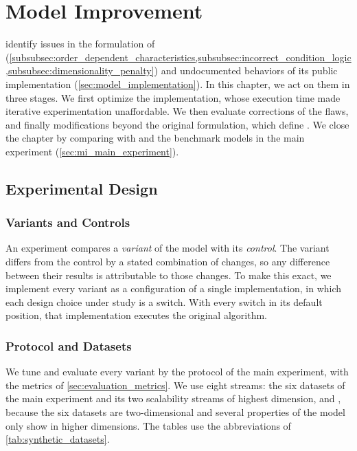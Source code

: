 \chapter{Model Improvement}
\label{chap:ModelImprovement}

 identify issues in the formulation of \MicroTEDAClus (\cref{subsubsec:order_dependent_characteristics,subsubsec:incorrect_condition_logic,subsubsec:dimensionality_penalty}) and undocumented behaviors of its public implementation (\cref{sec:model_implementation}). In this chapter, we act on them in three stages. We first optimize the implementation, whose execution time made iterative experimentation unaffordable. We then evaluate corrections of the flaws, and finally modifications beyond the original formulation, which define \MicroTEDAClusPlus. We close the chapter by comparing \MicroTEDAClusPlus with \MicroTEDAClus and the benchmark models in the main experiment (\cref{sec:mi_main_experiment}).

\section{Experimental Design}
\label{sec:mi_design}

\subsection{Variants and Controls}

An experiment compares a \emph{variant} of the model with its \emph{control}. The variant differs from the control by a stated combination of changes, so any difference between their results is attributable to those changes. To make this exact, we implement every variant as a configuration of a single implementation, in which each design choice under study is a switch. With every switch in its default position, that implementation executes the original algorithm.

\subsection{Protocol and Datasets}

We tune and evaluate every variant by the protocol of the main experiment, with the metrics of \cref{sec:evaluation_metrics}. We use eight streams: the six datasets of the main experiment and its two scalability streams of highest dimension,  and , because the six datasets are two-dimensional and several properties of the model only show in higher dimensions. The tables use the abbreviations of \cref{tab:synthetic_datasets}.

